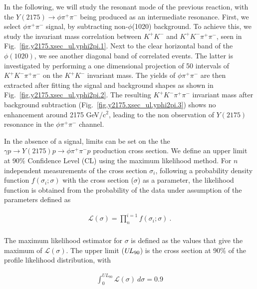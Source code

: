 In the following, we will study the resonant mode of the previous reaction, with the $Y(2175) \rightarrow \phi \pi^{+} \pi^{-}$ being produced as an intermediate resonance. First, we select $\phi \pi^+ \pi^-$ signal, by subtracting non-$\phi$(1020) background. To achieve this, we study the invariant mass correlation between $K^{+}K^{-}$ and $K^{+}K^{-} \pi^+ \pi^-$, seen in Fig.~\ref{fig.y2175.xsec_ul.yphi2pi.1}. Next to the clear horizontal band of the $\phi(1020)$, we see another diagonal band of correlated events. The latter is investigated by performing a one dimensional projection of 50 intervals of $K^{+}K^{-} \pi^+ \pi^-$ on the $K^{+}K^{-}$ invariant mass. The yields of $\phi \pi^+ \pi^-$ are then extracted after fitting the signal and background shapes as shown in Fig.~\ref{fig.y2175.xsec_ul.yphi2pi.2}. The resulting $K^{+}K^{-} \pi^+ \pi^-$ invariant mass after background subtraction (Fig.~\ref{fig.y2175.xsec_ul.yphi2pi.3}) shows no enhancement around 2175 GeV/c$^2$, leading to the non observation of $Y(2175)$ resonance in the $\phi \pi^+ \pi^-$ channel. 
~\par In the absence of a signal, limits can be set on the the $\gamma p \rightarrow Y(2175) p \rightarrow \phi \pi^{+} \pi^{-} p$ production cross section. We define an upper limit at 90$\%$ Confidence Level (CL) using the maximum likelihood method. For $n$ independent measurements of the cross section $\sigma_{i}$, following a probability density function $f(\sigma_{i};\sigma)$ with the cross section ($\sigma$) as a parameter, the likelihood function is obtained from the probability of the data under assumption of the parameters defined as

\begin{equation}
    \label{eq.y2175.xsec_ul.yphi2pi.1}
    \begin{aligned}
        \mathcal{L(\sigma)} = \prod_{n}^{i=1} f(\sigma_{i};\sigma)~.\\
    \end{aligned}
\end{equation}

\noindent The maximum likelihood estimator for $\sigma$ is defined as the values that give the maximum of $\mathcal{L(\sigma)}$. The upper limit ($U\kern-0.14em L_{90}$) is the cross section at 90$\%$ of the profile likelihood distribution, with

\begin{equation}
    \label{eq.y2175.xsec_ul.yphi2pi.2}
    \begin{aligned}
        \int_{0}^{UL_{90}} \mathcal{L}(\sigma)~d\sigma = 0.9 \\
    \end{aligned}
\end{equation}

